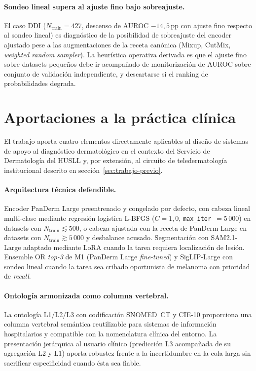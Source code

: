 \paragraph{Sondeo lineal supera al ajuste fino bajo sobreajuste.}
El caso DDI ($N_{\mathrm{train}} = 427$, descenso de AUROC
$-14{,}5$\,pp con ajuste fino respecto al sondeo lineal) es
diagnóstico de la posibilidad de sobreajuste del encoder ajustado
pese a las augmentaciones de la receta canónica (Mixup, CutMix,
\emph{weighted random sampler}). La heurística operativa derivada
es que el ajuste fino sobre datasets pequeños debe ir acompañado
de monitorización de AUROC sobre conjunto de validación
independiente, y descartarse si el ranking de probabilidades
degrada.

\section{Aportaciones a la práctica clínica}
\label{sec:aportaciones-clinicas}

El trabajo aporta cuatro elementos directamente aplicables al
diseño de sistemas de apoyo al diagnóstico dermatológico en el
contexto del Servicio de Dermatología del HUSLL y, por extensión,
al circuito de teledermatología institucional descrito en
secci\'on~\ref{sec:trabajo-previo}.

\paragraph{Arquitectura técnica defendible.}
Encoder PanDerm Large preentrenado y congelado por defecto, con
cabeza lineal multi-clase mediante regresión logística L-BFGS
($C = 1{,}0$, \texttt{max\_iter}~$=5\,000$) en datasets con
$N_{\mathrm{train}} \lesssim 500$, o cabeza ajustada con la
receta de PanDerm Large en datasets con
$N_{\mathrm{train}} \gtrsim 5\,000$ y desbalance acusado.
Segmentación con SAM2.1-Large adaptado mediante LoRA cuando la
tarea requiera localización de lesión. Ensemble OR \emph{top-3}
de M1 (PanDerm Large \emph{fine-tuned}) y SigLIP-Large con sondeo
lineal cuando la tarea sea cribado oportunista de melanoma con
prioridad de \emph{recall}.

\paragraph{Ontología armonizada como columna vertebral.}
La ontología L1/L2/L3 con codificación SNOMED~CT y CIE-10
proporciona una columna vertebral semántica reutilizable para
sistemas de información hospitalarios y compatible con la
nomenclatura clínica del entorno. La presentación jerárquica al
usuario clínico (predicción L3 acompañada de su agregación L2 y
L1) aporta robustez frente a la incertidumbre en la cola larga sin
sacrificar especificidad cuando ésta sea fiable.

